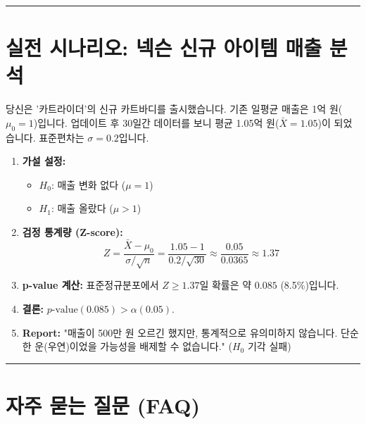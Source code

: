 \documentclass[11pt,a4paper]{book}
\theoremstyle{definition}
\begin{document}
\vspace{0.5cm}\hrule\vspace{0.5cm}

\section{실전 시나리오: 넥슨 신규 아이템 매출 분석}

\begin{storybox}[title={Scenario: 업데이트 효과 검증}]
당신은 '카트라이더'의 신규 카트바디를 출시했습니다.
기존 일평균 매출은 1억 원($\mu_0 = 1$)입니다. 업데이트 후 30일간 데이터를 보니 평균 1.05억 원($\bar{X} = 1.05$)이 되었습니다. 표준편차는 $\sigma = 0.2$입니다.
\end{storybox}

\begin{enumerate}
    \item \textbf{가설 설정:}
    \begin{itemize}
        \item $H_0$: 매출 변화 없다 ($\mu = 1$)
        \item $H_1$: 매출 올랐다 ($\mu > 1$)
    \end{itemize}
    \item \textbf{검정 통계량 (Z-score):}
    $$ Z = \frac{\bar{X} - \mu_0}{\sigma / \sqrt{n}} = \frac{1.05 - 1}{0.2 / \sqrt{30}} \approx \frac{0.05}{0.0365} \approx 1.37 $$
    \item \textbf{p-value 계산:}
    표준정규분포에서 $Z \ge 1.37$일 확률은 약 $0.085$ (8.5\%)입니다.
    \item \textbf{결론:}
    $p\text{-value}(0.085) > \alpha(0.05)$.
    \item \textbf{Report:} "매출이 500만 원 오르긴 했지만, 통계적으로 유의미하지 않습니다. 단순한 운(우연)이었을 가능성을 배제할 수 없습니다." ($H_0$ 기각 실패)
\end{enumerate}

\vspace{0.5cm}\hrule\vspace{0.5cm}

\section{자주 묻는 질문 (FAQ)}
\end{document}
